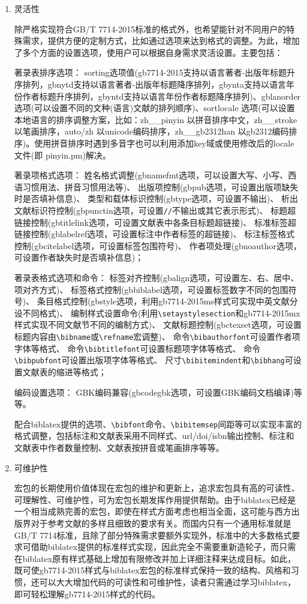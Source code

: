\documentclass[11pt]{article} %
\begin{document}
\begin{enumerate}
  \item 灵活性

除严格实现符合GB/T 7714-2015标准的格式外，也希望能针对不同用户的特殊需求，提供方便的定制方式，比如通过选项来达到格式的调整。为此，增加了多个方面的设置选项，使用户可以根据自身需求灵活设置。主要包括：

著录表排序选项：
sorting选项值(gb7714-2015支持以语言著者-出版年标题升序排列，gbnytd支持以语言著者-出版年标题降序排列，gbynta支持以语言年份作者标题升序排列，gbyntd支持以语言年份作者标题降序排列)、gblanorder 选项(可以设置不同的文种(语言)文献的排列顺序)、sortlocale 选项(可以设置本地语言的排序调整方案，比如：zh\_\_pinyin 以拼音排序中文，zh\_\_stroke 以笔画排序，auto/zh 以unicode编码排序，zh\_\_gb2312han 以gb2312编码排序)。使用拼音排序时遇到多音字也可以利用添加key域或使用修改后的locale文件(即 pinyin.pm)解决。


著录项格式选项：
姓名格式调整(gbnamefmt选项，可以设置大写、小写、西语习惯用法、拼音习惯用法等)、
出版项控制(gbpub选项，可设置出版项缺失时是否填补信息)、
类型和载体标识控制(gbtype选项，可设置不输出)、
析出文献标识符控制(gbpunctin选项，可设置\texttt{//}不输出或其它表示形式)、
标题超链接控制(gbtitlelink选项，可设置文献表中各条目标题超链接)、
标准标签超链接控制(gblabelref选项，可设置标注中作者标签的超链接)、
标注标签格式控制(gbcitelabel选项，可设置标签包围符号)、
作者项处理(gbnoauthor选项，可设置作者缺失时是否填补信息)；

著录表格式选项和命令：
标签对齐控制(gbalign选项，可设置左、右、居中、项对齐方式)、
标签格式控制(gbbiblabel选项，可设置标签数字不同的包围符号)、
条目格式控制(gbstyle选项，利用gb7714-2015ms样式可实现中英文献分设不同格式)、
编制样式设置命令(利用\verb|\setaystylesection|和gb7714-2015mx样式实现不同文献节不同的编制方式)、
文献标题控制(gbctexset选项，可设置标题内容由\verb|\bibname|或\verb|\refname|宏调整)、
命令\verb|\bibauthorfont|可设置作者项字体等格式、
命令\verb|\bibtitlefont|可设置标题项字体等格式、
命令\verb|\bibpubfont|可设置出版项字体等格式、
尺寸\verb|\bibitemindent|和\verb|\bibhang|可设置文献表的缩进等格式；

编码设置选项：
GBK编码兼容(gbcodegbk选项，可设置GBK编码文档编译)等等。

配合biblatex提供的选项、\verb|\bibfont|命令、\verb|\bibitemsep|间距等可以实现丰富的格式调整，包括标注和文献表采用不同样式、url/doi/isbn输出控制、标注和文献表中作者数量控制、文献表按拼音或笔画排序等等。


  \item 可维护性

宏包的长期使用价值体现在宏包的维护和更新上，追求宏包具有高的可读性、可理解性、可维护性，可为宏包长期发挥作用提供帮助。由于biblatex已经是一个相当成熟完善的宏包，即使在样式方面考虑也相当全面，这可能与西方出版界对于参考文献的多样且细致的要求有关。而国内只有一个通用标准就是GB/T 7714标准，且除了部分特殊需求要额外实现外，标准中的大多数格式要求可借助biblatex提供的标准样式实现，因此完全不需要重新造轮子，而只需在biblatex原有样式基础上增加有限修改并加上详细注释来达成目标。如此，既可使gb7714-2015样式与biblatex宏包的标准样式保持一致的结构、风格和习惯，还可以大大增加代码的可读性和可维护性，读者只需通过学习biblatex，即可轻松理解gb7714-2015样式的代码。



\end{enumerate}
\end{document}
